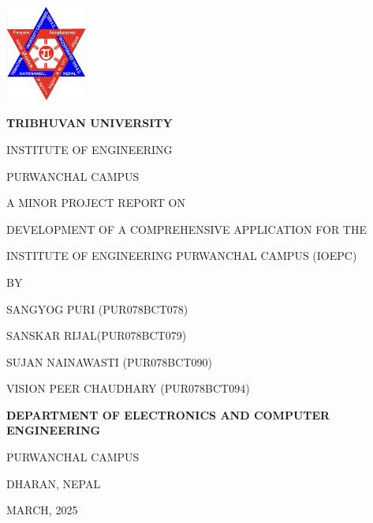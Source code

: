 \begin{titlepage}
    \centering
    
    \includegraphics[width=0.2\textwidth]{Graphics/TULogo.png}\par
    \vspace{1.2cm}
    {\fontsize{14pt}{12pt}\selectfont\bfseries\textcolor{black}
    TRIBHUVAN UNIVERSITY \par INSTITUTE OF ENGINEERING \par PURWANCHAL CAMPUS \par
    \vspace{1.2cm}
    \begin{flushleft}
    
    \end{flushleft}

    \par A MINOR PROJECT REPORT ON\par DEVELOPMENT OF A COMPREHENSIVE APPLICATION FOR THE \par INSTITUTE OF ENGINEERING PURWANCHAL CAMPUS (IOEPC) \par

    \vspace{1.2cm}
    BY\par SANGYOG PURI (PUR078BCT078)
      \par SANSKAR RIJAL(PUR078BCT079)
      \par SUJAN NAINAWASTI (PUR078BCT090)
      \par VISION PEER CHAUDHARY (PUR078BCT094)
    \par
    \vspace{1.2cm}\par
    }
    {\fontsize{13pt}{12pt}\selectfont\bfseries\textcolor{black}
    DEPARTMENT OF ELECTRONICS AND COMPUTER ENGINEERING\par PURWANCHAL CAMPUS\par DHARAN, NEPAL\par
    \vspace{1.2cm}
    \vspace{1.2cm}
    
    MARCH, 2025 
    }
\end{titlepage}

